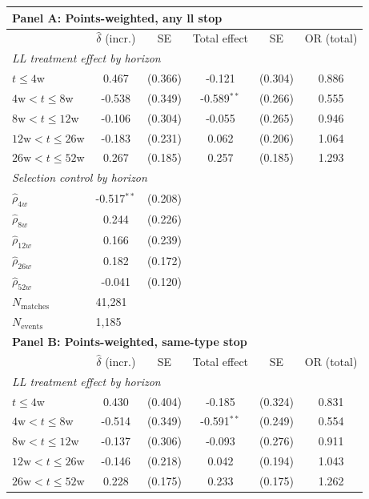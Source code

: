 \begin{tabular}{lccccc}
\toprule
\multicolumn{6}{l}{\textbf{Panel A: Points-weighted, any ll stop}} \\
\midrule
 & $\hat{\delta}$ (incr.) & SE & Total effect & SE & OR (total) \\
\midrule
\multicolumn{6}{l}{\textit{LL treatment effect by horizon}} \\
$t \leq 4$w & 0.467 & (0.366) & -0.121 & (0.304) & 0.886 \\
$4\text{w} < t \leq 8$w & -0.538 & (0.349) & -0.589$^{**}$ & (0.266) & 0.555 \\
$8\text{w} < t \leq 12$w & -0.106 & (0.304) & -0.055 & (0.265) & 0.946 \\
$12\text{w} < t \leq 26$w & -0.183 & (0.231) & 0.062 & (0.206) & 1.064 \\
$26\text{w} < t \leq 52$w & 0.267 & (0.185) & 0.257 & (0.185) & 1.293 \\
[4pt]
\multicolumn{6}{l}{\textit{Selection control by horizon}} \\
$\hat{\rho}_{4w}$ & -0.517$^{**}$ & (0.208) & & & \\
$\hat{\rho}_{8w}$ & 0.244 & (0.226) & & & \\
$\hat{\rho}_{12w}$ & 0.166 & (0.239) & & & \\
$\hat{\rho}_{26w}$ & 0.182 & (0.172) & & & \\
$\hat{\rho}_{52w}$ & -0.041 & (0.120) & & & \\
[4pt]
$N_{\text{matches}}$ & \multicolumn{5}{l}{41,281} \\
$N_{\text{events}}$ & \multicolumn{5}{l}{1,185} \\
\midrule
\multicolumn{6}{l}{\textbf{Panel B: Points-weighted, same-type stop}} \\
\midrule
 & $\hat{\delta}$ (incr.) & SE & Total effect & SE & OR (total) \\
\midrule
\multicolumn{6}{l}{\textit{LL treatment effect by horizon}} \\
$t \leq 4$w & 0.430 & (0.404) & -0.185 & (0.324) & 0.831 \\
$4\text{w} < t \leq 8$w & -0.514 & (0.349) & -0.591$^{**}$ & (0.249) & 0.554 \\
$8\text{w} < t \leq 12$w & -0.137 & (0.306) & -0.093 & (0.276) & 0.911 \\
$12\text{w} < t \leq 26$w & -0.146 & (0.218) & 0.042 & (0.194) & 1.043 \\
$26\text{w} < t \leq 52$w & 0.228 & (0.175) & 0.233 & (0.175) & 1.262 \\

\end{tabular}
